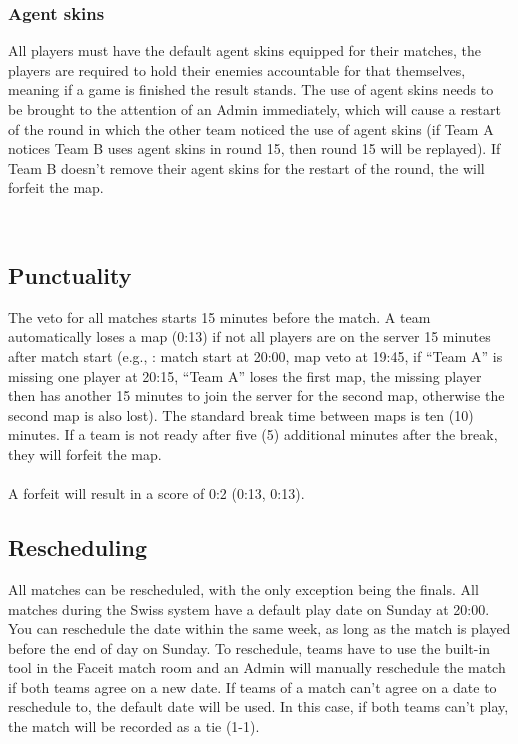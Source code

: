 \documentclass{article}
\newcommand{\TeamA}{{\color{red}Team A }}
\newcommand{\TeamB}{{\color{blue}Team B }}
\begin{document}
\subsubsection{Agent skins}
All players must have the default agent skins equipped for their matches, the players are required to hold their enemies accountable for that themselves, meaning if a game is finished the result stands. The use of agent skins needs to be brought to 
the attention of an Admin immediately, which will cause a restart of the round in which the other team noticed the use of agent skins (if \TeamA notices \TeamB uses agent skins in round 15, then round 15 will be replayed). If \TeamB doesn't remove their agent skins for the restart of the round, the will forfeit the map.   


\\

\subsection{Punctuality}
The veto for all matches starts 15 minutes before the match. A team automatically loses a map (0:13) if not all players are on the server 15 minutes after match start (e.g., : match start at 20:00, map veto at 19:45, if “Team A” is missing one player at 20:15, “Team A” loses the first map, the missing player then has another 15 minutes to join the server for the second map, otherwise the second map is also lost). The standard break time between maps is ten (10) minutes. If a team is not ready after five (5) additional minutes after the break, they will forfeit the map. \\
\\
A forfeit will result in a score of 0:2 (0:13, 0:13).

\subsection{Rescheduling}
All matches can be rescheduled, with the only exception being the finals. All matches during the Swiss system have a default play date on Sunday at 20:00. You can reschedule the date within the same week, as long as the match is played before the end of day
on Sunday. To reschedule, teams have to use the built-in tool in the Faceit match room and an Admin will manually reschedule the match if both teams agree on a new date. If teams of a match can't agree on a date to reschedule to, the default date will be used. In this case, if both teams can't play, the match will be recorded as a tie (1-1).
\end{document}
